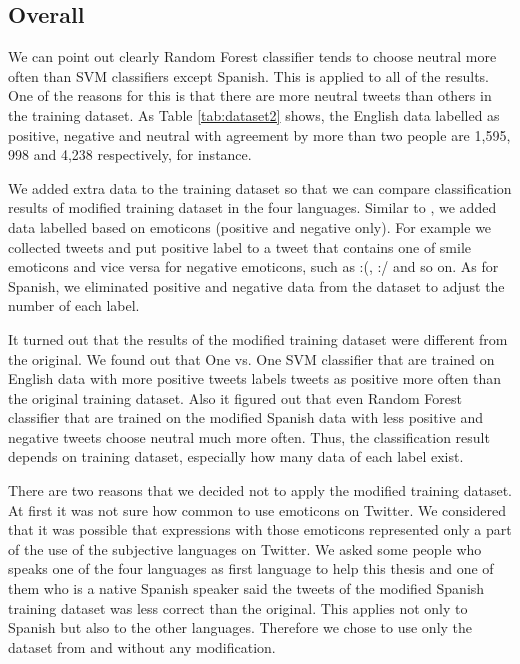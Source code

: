 \subsection{Overall}\label{sec:discussion_overall}
We can point out clearly Random Forest classifier tends to choose neutral more often than SVM classifiers except Spanish.
This is applied to all of the results.
One of the reasons for this is that there are more neutral tweets than others in the training dataset.
As Table \ref{tab:dataset2} shows, the English data labelled as positive, negative and neutral with agreement by more than two people are 1,595, 998 and 4,238 respectively, for instance.

We added extra data to the training dataset so that we can compare classification results of modified training dataset in the four languages.
Similar to \cite{dataset}, we added data labelled based on emoticons (positive and negative only).
For example we collected tweets and put positive label to a tweet that contains one of smile emoticons and vice versa for negative emoticons, such as :(, :/ and so on.
As for Spanish, we eliminated positive and negative data from the dataset to adjust the number of each label. 

It turned out that the results of the modified training dataset were different from the original.
We found out that One vs. One SVM classifier that are trained on English data with more positive tweets labels tweets as positive more often than the original training dataset. 
Also it figured out that even Random Forest classifier that are trained on the modified Spanish data with less positive and negative tweets choose neutral much more often.
Thus, the classification result depends on training dataset, especially how many data of each label exist.

There are two reasons that we decided not to apply the modified training dataset.
At first it was not sure how common to use emoticons on Twitter.
We considered that it was possible that expressions with those emoticons represented only a part of the use of the subjective languages on Twitter.
We asked some people who speaks one of the four languages as first language to help this thesis and one of them who is a native Spanish speaker said the tweets of the modified Spanish training dataset was less correct than the original. 
This applies not only to Spanish but also to the other languages.
Therefore we chose to use only the dataset from \cite{dataset} and \cite{dataset_spanish} without any modification.

